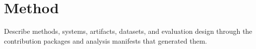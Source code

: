 \section{Method}

Describe methods, systems, artifacts, datasets, and evaluation design through
the contribution packages and analysis manifests that generated them.
